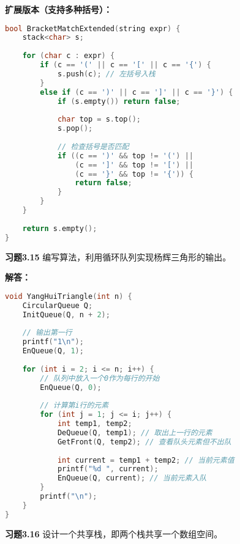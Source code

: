 \documentclass[12pt,a4paper]{amsart}
\begin{document}
\textbf{扩展版本（支持多种括号）：}
\begin{lstlisting}[language=C++]
bool BracketMatchExtended(string expr) {
    stack<char> s;
    
    for (char c : expr) {
        if (c == '(' || c == '[' || c == '{') {
            s.push(c); // 左括号入栈
        }
        else if (c == ')' || c == ']' || c == '}') {
            if (s.empty()) return false;
            
            char top = s.top();
            s.pop();
            
            // 检查括号是否匹配
            if ((c == ')' && top != '(') ||
                (c == ']' && top != '[') ||
                (c == '}' && top != '{')) {
                return false;
            }
        }
    }
    
    return s.empty();
}
\end{lstlisting}

\textbf{习题3.15} 编写算法，利用循环队列实现杨辉三角形的输出。

\textbf{解答：}
\begin{lstlisting}[language=C++]
void YangHuiTriangle(int n) {
    CircularQueue Q;
    InitQueue(Q, n + 2);
    
    // 输出第一行
    printf("1\n");
    EnQueue(Q, 1);
    
    for (int i = 2; i <= n; i++) {
        // 队列中放入一个0作为每行的开始
        EnQueue(Q, 0);
        
        // 计算第i行的元素
        for (int j = 1; j <= i; j++) {
            int temp1, temp2;
            DeQueue(Q, temp1); // 取出上一行的元素
            GetFront(Q, temp2); // 查看队头元素但不出队
            
            int current = temp1 + temp2; // 当前元素值
            printf("%d ", current);
            EnQueue(Q, current); // 当前元素入队
        }
        printf("\n");
    }
}
\end{lstlisting}

\textbf{习题3.16} 设计一个共享栈，即两个栈共享一个数组空间。
\end{document}
